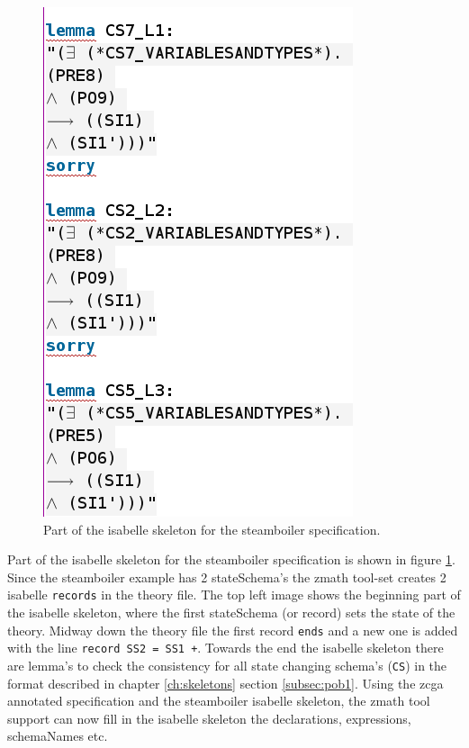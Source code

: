 \begin{figure}[H]
\begin{minipage}{0.53\textwidth}
\end{minipage}
\begin{minipage}{0.45\textwidth}
\centering
\includegraphics[scale=0.5]{Figures/Evaluation/4imagec.png}
\end{minipage}
\caption{Part of the isabelle skeleton for the steamboiler specification.\label{fig:steamisaskel}}
\end{figure}

Part of the isabelle skeleton for the steamboiler specification is shown in
figure \ref{fig:steamisaskel}. Since the steamboiler example has 2 stateSchema's
the \gls{zmath} tool-set creates 2 isabelle 	\texttt{records} in the theory file.
The top left image shows the beginning part of the isabelle skeleton, where the
first stateSchema (or record) sets the state of the theory. Midway down the
theory file the first record \texttt{ends} and a new one is added with the line
\verb|record SS2 = SS1 +|. Towards the end the isabelle skeleton there are
lemma's to check the consistency for all state changing schema's (\texttt{CS})
in the format described in chapter \ref{ch:skeletons} section \ref{subsec:pob1}.
Using the \gls{zcga} annotated specification and the steamboiler isabelle
skeleton, the \gls{zmath} tool support can now fill in the isabelle skeleton the
declarations, expressions, schemaNames etc.


